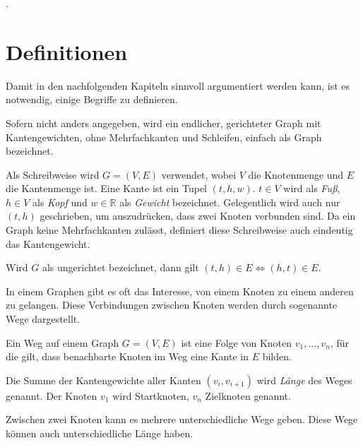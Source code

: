 .

\section{Definitionen}
Damit in den nachfolgenden Kapiteln sinnvoll argumentiert werden kann, ist es notwendig, einige Begriffe zu definieren.

\begin{definition}[Graph]
    Sofern nicht anders angegeben, wird ein endlicher, gerichteter Graph mit Kantengewichten, ohne Mehrfachkanten und Schleifen, einfach als Graph bezeichnet.

    Als Schreibweise wird $G = (V, E)$ verwendet, wobei $V$ die Knotenmenge und $E$ die Kantenmenge ist. Eine Kante ist ein Tupel $(t, h, w)$. $t \in V$ wird als \emph{Fuß}, $h \in V$ als \emph{Kopf} und $w \in \mathbb{R}$ als \emph{Gewicht} bezeichnet. Gelegentlich wird auch nur $(t, h)$ geschrieben, um auszudrücken, dass zwei Knoten verbunden sind. Da ein Graph keine Mehrfachkanten zulässt, definiert diese Schreibweise auch eindeutig das Kantengewicht.

    Wird $G$ als ungerichtet bezeichnet, dann gilt $(t, h) \in E \Leftrightarrow (h, t) \in E$.
\end{definition}

In einem Graphen gibt es oft das Interesse, von einem Knoten zu einem anderen zu gelangen.
Diese Verbindungen zwischen Knoten werden durch sogenannte Wege dargestellt.

\begin{definition}[Weg]
    Ein Weg auf einem Graph $G = (V, E)$ ist eine Folge von Knoten $v_1, \dotsc, v_n$, für die gilt, dass benachbarte Knoten im Weg eine Kante in $E$ bilden.


    Die Summe der Kantengewichte aller Kanten $(v_i, v_{i + 1})$ wird \emph{Länge} des Weges genannt. Der Knoten $v_1$ wird Startknoten, $v_n$ Zielknoten genannt.
\end{definition}

Zwischen zwei Knoten kann es mehrere unterschiedliche Wege geben.
Diese Wege können auch unterschiedliche Länge haben.

